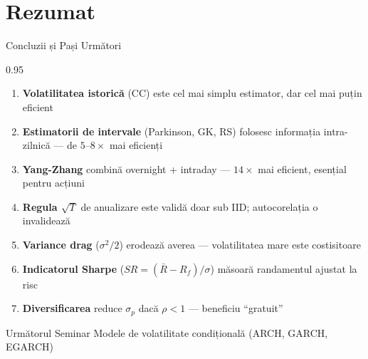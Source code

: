 \documentclass[9pt, aspectratio=169, t]{beamer}
\begin{document}
\section{Rezumat}

\begin{frame}[shrink=10]{Concluzii și Pași Următori}
\begin{cminipage}{0.95\textwidth}
    \begin{enumerate}\setlength{\itemsep}{0pt}
        \item \textbf{Volatilitatea istorică} (CC) este cel mai simplu estimator, dar cel mai puțin eficient
        \item \textbf{Estimatorii de intervale} (Parkinson, GK, RS) folosesc informația intra-zilnică --- de $5$--$8\times$ mai eficienți
        \item \textbf{Yang-Zhang} combină overnight + intraday --- $14\times$ mai eficient, esențial pentru acțiuni
        \item \textbf{Regula $\sqrt{T}$} de anualizare este validă doar sub IID; autocorelația o invalidează
        \item \textbf{Variance drag} ($\sigma^2/2$) erodează averea --- volatilitatea mare este costisitoare
        \item \textbf{Indicatorul Sharpe} ($SR = (\bar{R} - R_f)/\sigma$) măsoară randamentul ajustat la risc
        \item \textbf{Diversificarea} reduce $\sigma_p$ dacă $\rho < 1$ --- beneficiu ``gratuit''
    \end{enumerate}

    \vspace{0.3cm}
    \begin{block}{Următorul Seminar}
        Modele de volatilitate condițională (ARCH, GARCH, EGARCH)
    \end{block}
\end{cminipage}
\end{frame}
\end{document}
